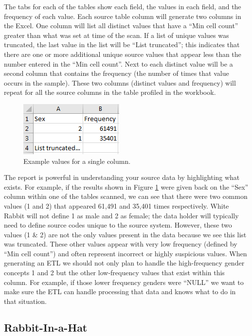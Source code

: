 \documentclass[11pt]{book}
\theoremstyle{definition}
\theoremstyle{definition}
\theoremstyle{definition}
\theoremstyle{remark}
\begin{document}
The tabs for each of the tables show each field, the values in each field, and the frequency of each value. Each source table column will generate two columns in the Excel. One column will list all distinct values that have a ``Min cell count'' greater than what was set at time of the scan. If a list of unique values was truncated, the last value in the list will be ``List truncated''; this indicates that there are one or more additional unique source values that appear less than the number entered in the ``Min cell count''. Next to each distinct value will be a second column that contains the frequency (the number of times that value occurs in the sample). These two columns (distinct values and frequency) will repeat for all the source columns in the table profiled in the workbook.

\begin{figure}
\includegraphics[width=0.3\linewidth]{images/ExtractTransformLoad/ScanSex} \caption{Example values for a single column.}\label{fig:scanSex}
\end{figure}

The report is powerful in understanding your source data by highlighting what exists. For example, if the results shown in Figure \ref{fig:scanSex} were given back on the ``Sex'' column within one of the tables scanned, we can see that there were two common values (1 and 2) that appeared 61,491 and 35,401 times respectively. White Rabbit will not define 1 as male and 2 as female; the data holder will typically need to define source codes unique to the source system. However, these two values (1 \& 2) are not the only values present in the data because we see this list was truncated. These other values appear with very low frequency (defined by ``Min cell count'') and often represent incorrect or highly suspicious values. When generating an ETL we should not only plan to handle the high-frequency gender concepts 1 and 2 but the other low-frequency values that exist within this column. For example, if those lower frequency genders were ``NULL'' we want to make sure the ETL can handle processing that data and knows what to do in that situation.

\hypertarget{rabbit-in-a-hat}{%
\subsection{Rabbit-In-a-Hat}\label{rabbit-in-a-hat}}
\end{document}
